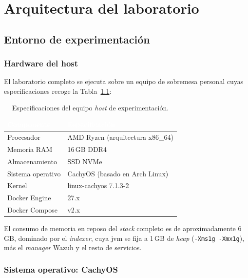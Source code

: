 \documentclass[../main.tex]{subfiles}
\begin{document}
\chapter{Arquitectura del laboratorio}
\label{C:arquitectura}

\section{Entorno de experimentación}

\subsection{Hardware del host}

El laboratorio completo se ejecuta sobre un equipo de sobremesa personal cuyas
especificaciones recoge la Tabla~\ref{tab:hardware}:

\begin{table}[ht]
  \centering
  \begin{tabularx}{\textwidth}{X X}
    \toprule
    \rowcolor{tabla-cabecera}
    \textcolor{white}{\textbf{Componente}} &
    \textcolor{white}{\textbf{Especificación}} \\
    \midrule
    Procesador        & AMD Ryzen (arquitectura x86\_64) \\
    Memoria RAM       & 16\,GB DDR4 \\
    Almacenamiento    & SSD NVMe \\
    Sistema operativo & CachyOS (basado en Arch Linux) \\
    Kernel            & linux-cachyos 7.1.3-2 \\
    Docker Engine     & 27.x \\
    Docker Compose    & v2.x \\
    \bottomrule
  \end{tabularx}
  \caption{Especificaciones del equipo \textit{host} de experimentación.}
  \label{tab:hardware}
\end{table}

El consumo de memoria en reposo del \emph{stack} completo es de aproximadamente
6\,GB, dominado por el \emph{indexer}, cuya \gls{jvm} se fija a 1\,GB de \emph{heap}
(\texttt{-Xms1g -Xmx1g}), más el \emph{manager} Wazuh y el resto de servicios.

\subsection{Sistema operativo: CachyOS}
\end{document}
